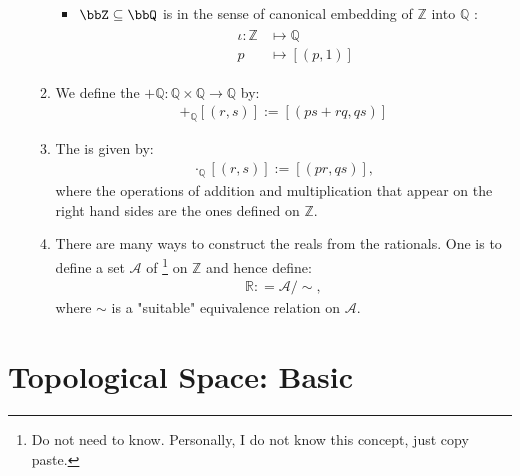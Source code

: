 \documentclass{article}
\begin{document}
\begin{enumerate}
\begin{enumerate}
\begin{itemize}
    \item $\bbZ\subseteq\bbQ$ is in the sense of canonical embedding of $\mathbb{Z}$ into $\mathbb{Q}$ :
\begin{align*}
\begin{aligned}
\iota: \mathbb{Z} & \mapsto \mathbb{Q} \\
p & \mapsto[(p, 1)]
\end{aligned}
\end{align*}
\end{itemize}
\item We define the  $+\mathbb{Q:} \mathbb{Q} \times \mathbb{Q} \rightarrow \mathbb{Q}$ by:
\begin{align*}
[(p, q)]+_{\mathbb{Q}}[(r, s)]:=[(p s+r q, q s)]
\end{align*}
\item The  is given by:
\begin{align*}
[(p, q)] \cdot_\mathbb{Q}[(r, s)]:=[(p r, q s)],
\end{align*}
where the operations of addition and multiplication that appear on the right hand sides are the ones defined on $\mathbb{Z}$. 

\item  There are many ways to construct the reals from the rationals. One is to define a set $\mathscr{A}$ of \footnote{Do not need to know. Personally, I do not know this concept, just copy paste. } on $\mathbb{Z}$ and hence define:
\begin{align*}
\mathbb{R:}=\mathscr{A} / \sim,
\end{align*}
where $\sim$ is a "suitable" equivalence relation on $\mathscr{A}$.
\end{enumerate}

\end{enumerate}

\section{Topological Space: Basic}

\end{document}
